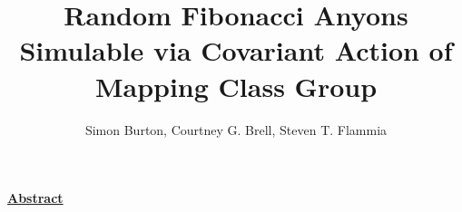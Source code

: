 \documentclass[11pt,a4paper]{article}
\begin{document}
\title{Random Fibonacci Anyons Simulable via Covariant Action of Mapping Class Group}

\author{Simon Burton, Courtney G. Brell, Steven T. Flammia}


%
%

%

\maketitle



\def\Complex {C}
\def\tensor{\otimes}
\def\Tensor{\bigotimes}
\def\bra #1{\langle #1|}
\def\ket #1{|#1\rangle}
\def\braket #1#2{\langle #1|#2 \rangle}



\def\mathZ{\mathbb{Z}}
\def\mathR{\mathbb{R}}


\def\heading #1{\vskip 20pt \noindent\underline{\large \bf #1}\vskip 5pt}

\def\important #1{\underline{\bf #1}}



\heading{Abstract}
\end{document}
